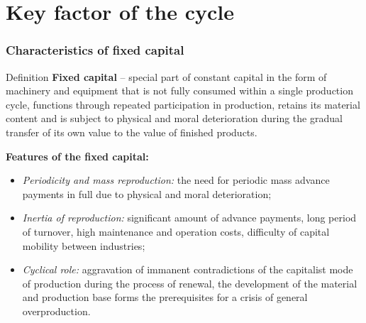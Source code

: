 \section{Key factor of the cycle}

\begin{frame}
  \frametitle{Characteristics of fixed capital}
  \begin{block}{Definition}
    \textbf{Fixed capital} –  special part of constant capital in the form of machinery and equipment that is not fully consumed within a single production cycle, functions through repeated participation in production, retains its material content and is subject to physical and moral deterioration during the gradual transfer of its own value to the value of finished products.
  \end{block}

  \textbf{Features of the fixed capital:}
  \begin{itemize}
    \item \textit{Periodicity and mass reproduction:} the need for periodic mass advance payments in full due to physical and moral deterioration;
    \item \textit{Inertia of reproduction:} significant amount of advance payments, long period of turnover, high maintenance and operation costs, difficulty of capital mobility between industries;
    \item \textit{Cyclical role:} aggravation of immanent contradictions of the capitalist mode of production during the process of renewal, the development of the material and production base forms the prerequisites for a crisis of general overproduction.
  \end{itemize}
\end{frame}

